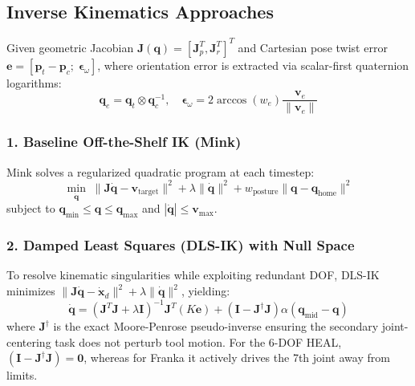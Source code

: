 \documentclass[10pt,twocolumn]{article}
\begin{document}
\subsection{Inverse Kinematics Approaches}
Given geometric Jacobian $\mathbf{J}(\mathbf{q}) = [\mathbf{J}_p^T, \mathbf{J}_r^T]^T$ and Cartesian pose twist error $\mathbf{e} = [\mathbf{p}_t - \mathbf{p}_c; \; \boldsymbol{\epsilon}_\omega]$, where orientation error is extracted via scalar-first quaternion logarithms:
\begin{equation}
    \mathbf{q}_e = \mathbf{q}_t \otimes \mathbf{q}_c^{-1}, \quad \boldsymbol{\epsilon}_\omega = 2 \arccos(w_e) \frac{\mathbf{v}_e}{\|\mathbf{v}_e\|}
\end{equation}

\subsubsection{1. Baseline Off-the-Shelf IK (Mink)}
Mink solves a regularized quadratic program at each timestep:
\begin{equation}
    \min_{\dot{\mathbf{q}}} \; \|\mathbf{J}\dot{\mathbf{q}} - \mathbf{v}_{\text{target}}\|^2 + \lambda \|\dot{\mathbf{q}}\|^2 + w_{\text{posture}}\|\mathbf{q} - \mathbf{q}_{\text{home}}\|^2
\end{equation}
subject to $\mathbf{q}_{\min} \le \mathbf{q} \le \mathbf{q}_{\max}$ and $|\dot{\mathbf{q}}| \le \mathbf{v}_{\max}$.

\subsubsection{2. Damped Least Squares (DLS-IK) with Null Space}
To resolve kinematic singularities while exploiting redundant DOF, DLS-IK minimizes $\|\mathbf{J}\dot{\mathbf{q}} - \dot{\mathbf{x}}_d\|^2 + \lambda \|\dot{\mathbf{q}}\|^2$, yielding:
\begin{equation}
    \dot{\mathbf{q}} = (\mathbf{J}^T \mathbf{J} + \lambda \mathbf{I})^{-1} \mathbf{J}^T (K \mathbf{e}) + (\mathbf{I} - \mathbf{J}^\dagger \mathbf{J}) \alpha (\mathbf{q}_{\text{mid}} - \mathbf{q})
\end{equation}
where $\mathbf{J}^\dagger$ is the exact Moore-Penrose pseudo-inverse ensuring the secondary joint-centering task does not perturb tool motion. For the 6-DOF HEAL, $(\mathbf{I} - \mathbf{J}^\dagger \mathbf{J}) = \mathbf{0}$, whereas for Franka it actively drives the 7th joint away from limits.
\end{document}

